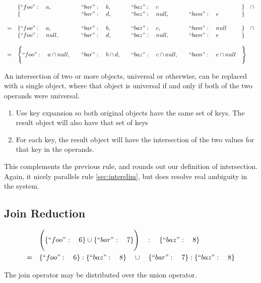 \documentclass[letterpaper]{article}
\begin{document}
\begin{prule}
\label{sec:interobj}
\begin{equation}
\begin{array}{rlllll}
& \{``foo":\quad a,\quad&``bar":\quad b,\quad&``baz":\quad c&&\}\quad\cap\\
& \{&``bar":\quad d,\quad&``baz":\quad null,\quad&``bam":\quad e&\} \\
\\
=&\{``foo":\quad a,\quad&``bar":\quad b,\quad&``baz":\quad c,\quad&``bam":\quad null&\}\quad\cap\\
 &\{``foo":\quad null,\quad&``bar":\quad d,\quad&``baz":\quad null,\quad&``bam":\quad e&\} \\
\\
=&\Bigg\{``foo":\quad a\cap null,\quad&``bar":\quad b\cap
d,\quad&``baz":\quad c\cap null,\quad&``bam":\quad e\cap null&\Bigg\}\\
\end{array}
\end{equation}

An intersection of two or more objects, universal or otherwise, can be replaced
with a single object, where that object is universal if and only if both of
the two operands were universal.
\begin{enumerate}
\item Use key expansion so both original objects have the same set of keys. The
result object will also have that set of keys
\item For each key, the result object will have the intersection of the two
values for that key in the operands.
\end{enumerate}
\end{prule}

This complements the previous rule, and rounds out our definition of
intersection. Again, it nicely parallels rule \ref{sec:interelim}, but does
resolve real ambiguity in the system.

\subsection{Join Reduction}

\begin{prule}
\begin{equation}
\begin{split}
& \Bigg( \{``foo":\quad6\} \cup \{``bar":\quad7\} \Bigg) \quad : \quad
\{``baz":\quad8\} \\
= \quad& \{``foo":\quad6\} : \{``baz":\quad8\} \quad \cup \quad \{``bar":\quad7\}
 : \{``baz":\quad8\}
\end{split}
\end{equation}

The join operator may be distributed over the union operator.
\end{prule}
\end{document}
